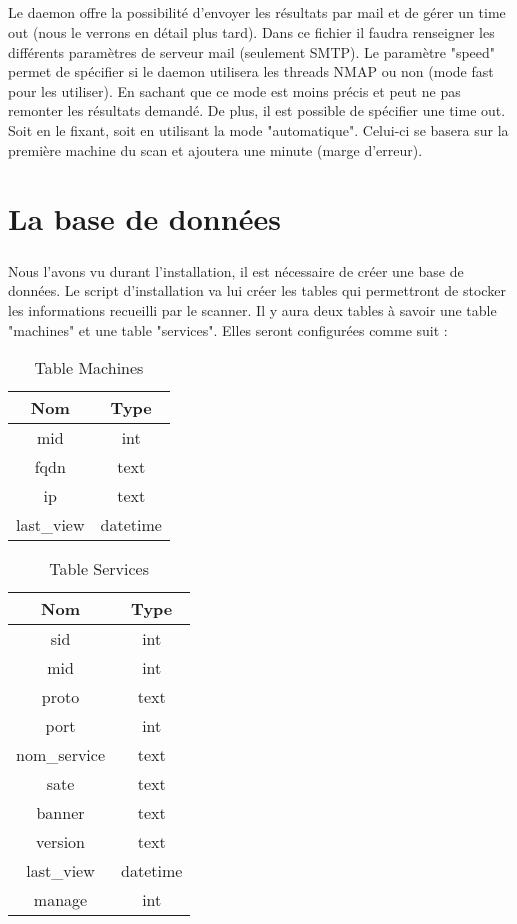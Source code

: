 \documentclass[12pt]{report}
\begin{document}
		\paragraph{}
			Le daemon offre la possibilité d'envoyer les résultats par mail et de gérer un time out (nous le verrons en détail plus tard). Dans ce fichier il faudra renseigner les différents paramètres de serveur mail (seulement SMTP). Le paramètre "speed" permet de spécifier si le daemon utilisera les threads NMAP ou non (mode fast pour les utiliser). En sachant que ce mode est moins précis et peut ne pas remonter les résultats demandé. De plus, il est possible de spécifier une time out. Soit en le fixant, soit en utilisant la mode "automatique". Celui-ci se basera sur la première machine du scan et ajoutera une minute (marge d'erreur).
	\chapter{La base de données}
		\paragraph{}
			Nous l'avons vu durant l'installation, il est nécessaire de créer une base de données. Le script d'installation va lui créer les tables qui permettront de stocker les informations recueilli par le scanner. Il y aura deux tables à savoir une table "machines" et une table "services". Elles seront configurées comme suit :\\
			\begin{table}[h]
			\centering
			\begin{tabular}{|c|c|}
				\hline
					Nom & Type \\
				\hline
				\hline
					mid & int \\
				\hline
					fqdn & text \\
				\hline
					ip & text \\
				\hline
					last\_view & datetime\\
				\hline
			\end{tabular}
			\caption{\label{machines_bdd} Table Machines}
			\end{table}
			\begin{table}[h]
			\centering
			\begin{tabular}{|c|c|}
				\hline
					Nom & Type \\
				\hline
				\hline
					sid & int \\
				\hline
					mid & int \\
				\hline
					proto & text \\
				\hline
					port & int \\
				\hline
					nom\_service & text \\
				\hline
					sate & text \\
				\hline
					banner & text \\
				\hline
					version & text \\
				\hline
					last\_view & datetime \\
				\hline
					manage & int \\
				\hline
			\end{tabular}
			\caption{\label{services_bdd} Table Services}
			\end{table}
\end{document}
